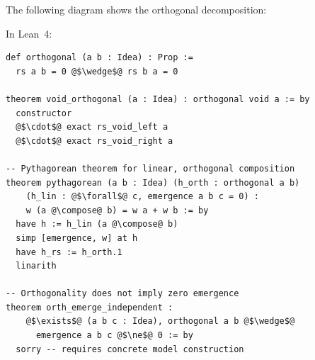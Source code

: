 The following diagram shows the orthogonal decomposition:

\begin{center}
\end{center}

In Lean~4:

\begin{lstlisting}
def orthogonal (a b : Idea) : Prop :=
  rs a b = 0 @$\wedge$@ rs b a = 0

theorem void_orthogonal (a : Idea) : orthogonal void a := by
  constructor
  @$\cdot$@ exact rs_void_left a
  @$\cdot$@ exact rs_void_right a

-- Pythagorean theorem for linear, orthogonal composition
theorem pythagorean (a b : Idea) (h_orth : orthogonal a b)
    (h_lin : @$\forall$@ c, emergence a b c = 0) :
    w (a @\compose@ b) = w a + w b := by
  have h := h_lin (a @\compose@ b)
  simp [emergence, w] at h
  have h_rs := h_orth.1
  linarith

-- Orthogonality does not imply zero emergence
theorem orth_emerge_independent :
    @$\exists$@ (a b c : Idea), orthogonal a b @$\wedge$@
      emergence a b c @$\ne$@ 0 := by
  sorry -- requires concrete model construction
\end{lstlisting}




